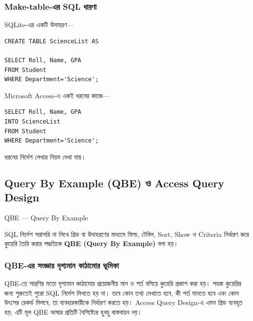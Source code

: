 \subsubsection{Make-table-এর SQL ধারণা}

SQLite-এর একটি উদাহরণ—

\par\noindent\begin{minipage}{\linewidth}
\begin{verbatim}
CREATE TABLE ScienceList AS

SELECT Roll, Name, GPA
FROM Student
WHERE Department='Science';
\end{verbatim}
\end{minipage}\par

Microsoft Access-এ একই ধরনের কাজে—

\par\noindent\begin{minipage}{\linewidth}
\begin{verbatim}
SELECT Roll, Name, GPA
INTO ScienceList
FROM Student
WHERE Department='Science';
\end{verbatim}
\end{minipage}\par

ধরনের নির্দেশ লেখার নিয়ম দেখা যায়।

\subsection{Query By Example (QBE) ও Access Query Design}

\begin{definitionbox}{QBE — Query By Example}

SQL নির্দেশ সরাসরি না লিখে গ্রিড বা উদাহরণের মাধ্যমে
ফিল্ড, টেবিল, Sort, Show ও Criteria নির্ধারণ করে কুয়েরি তৈরি করার
পদ্ধতিকে \textbf{QBE (Query By Example)} বলা হয়।

\end{definitionbox}

\subsubsection{QBE-এর সংজ্ঞায় দৃশ্যমান কাঠামোর ভূমিকা}
QBE-তে সারণির মতো দৃশ্যমান কাঠামোয় প্রয়োজনীয় মান ও শর্ত বসিয়ে কুয়েরি প্রকাশ করা হয়। সহজ কুয়েরির জন্য শুরুতেই পুরো SQL নির্দেশ লিখতে হয় না। তবে কোন তথ্য দেখাতে হবে, কী শর্ত মানতে হবে এবং কোন উৎসের রেকর্ড মিলবে, তা ব্যবহারকারীকে নির্ধারণ করতে হয়। Access Query Design-এ এমন গ্রিড ব্যবহৃত হয়; এটি মূল QBE ভাষার প্রতিটি বৈশিষ্ট্যের হুবহু বাস্তবায়ন নয়।


